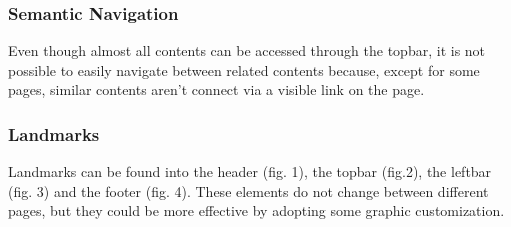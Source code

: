 \subsubsection{Semantic Navigation}
Even though almost all contents can be accessed through the topbar, it is not possible to easily navigate between related contents because, except for some pages, similar contents aren't connect via a visible link on the page. 

\subsubsection{Landmarks}
Landmarks can be found into the header (fig. 1), the topbar (fig.2), the leftbar (fig. 3) and the footer (fig. 4). These elements do not change between different pages, but they could be more effective by adopting some graphic customization.
\clearpage